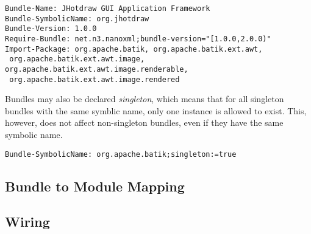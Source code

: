\begin{lstlisting}[caption=Require-bundle and Import-package]
Bundle-Name: JHotdraw GUI Application Framework
Bundle-SymbolicName: org.jhotdraw
Bundle-Version: 1.0.0
Require-Bundle: net.n3.nanoxml;bundle-version="[1.0.0,2.0.0)"
Import-Package: org.apache.batik, org.apache.batik.ext.awt,
 org.apache.batik.ext.awt.image, org.apache.batik.ext.awt.image.renderable,
 org.apache.batik.ext.awt.image.rendered
\end{lstlisting}

Bundles may also be declared \textit{singleton}, which means that for all
singleton bundles with the same symblic name, only one instance is allowed to
exist. This, however, does not affect non-singleton bundles, even if they have
the same symbolic name.

\begin{lstlisting}[caption=Singleton Bundle]
Bundle-SymbolicName: org.apache.batik;singleton:=true
\end{lstlisting}




\subsection{Bundle to Module Mapping}

\subsection{Wiring}